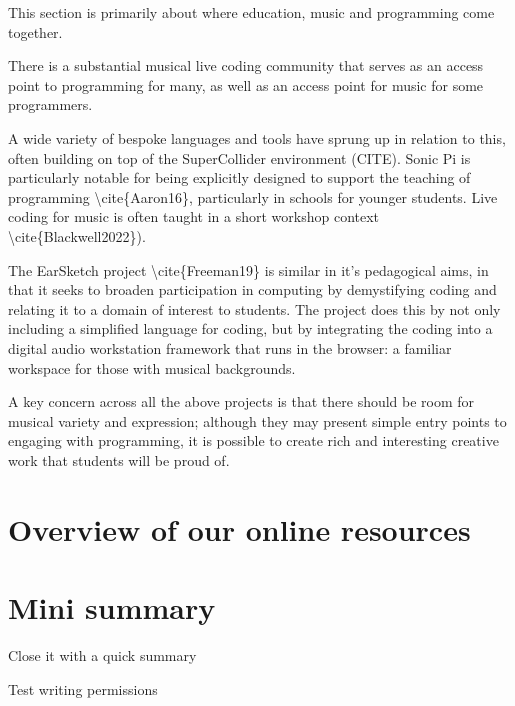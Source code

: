  This section is primarily about where education, music and programming come together.


 There is a substantial musical live coding community that serves as an access point to programming for many, as well as an access point for music for some programmers.

A wide variety of bespoke languages and tools have sprung up in relation to this, often building on top of the SuperCollider environment (CITE). Sonic Pi is particularly notable for being explicitly designed to support the teaching of programming \textbackslash{}cite\{Aaron16\}, particularly in schools for younger students. Live coding for music is often taught in a short workshop context \textbackslash{}cite\{Blackwell2022\}).

The EarSketch project \textbackslash{}cite\{Freeman19\} is similar in it’s pedagogical aims, in that it seeks to broaden participation in computing by demystifying coding and relating it to a domain of interest to students. The project does this by not only including a simplified language for coding, but by integrating the coding into a digital audio workstation framework that runs in the browser: a familiar workspace for those with musical backgrounds. 

A key concern across all the above projects is that there should be room for musical variety and expression; although they may present simple entry points to engaging with programming, it is possible to create rich and interesting creative work that students will be proud of.


 

\section{Overview of our online resources} \label{sec:resources}


\section{Mini summary}
Close it with a quick summary

Test writing permissions
